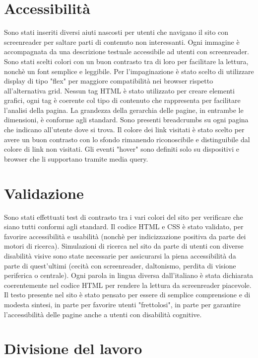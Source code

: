 \documentclass[a4paper, 12pt]{article}
\begin{document}
\section{Accessibilità}
Sono stati inseriti diversi aiuti nascosti per utenti che navigano il sito con screenreader per saltare parti di contenuto non interessanti.
Ogni immagine è accompagnata da una descrizione testuale accessibile ad utenti con screenreader.
Sono stati scelti colori con un buon contrasto tra di loro per facilitare la lettura, nonchè un font semplice e leggibile.
Per l'impaginazione è stato scelto di utilizzare display di tipo "flex" per maggiore compatibilità nei browser rispetto all'alternativa grid.
Nessun tag HTML è stato utilizzato per creare elementi grafici, ogni tag è coerente col tipo di contenuto che rappresenta per facilitare l'analisi della pagina.
La grandezza della gerarchia delle pagine, in entrambe le dimensioni, è conforme agli standard.
Sono presenti breadcrumbs su ogni pagina che indicano all'utente dove si trova.
Il colore dei link visitati è stato scelto per avere un buon contrasto con lo sfondo rimanendo riconoscibile e distinguibile dal colore di link non visitati.
Gli eventi "hover" sono definiti solo su dispositivi e browser che li supportano tramite media query.

\section{Validazione}
Sono stati effettuati test di contrasto tra i vari colori del sito per verificare che siano tutti conformi agli standard.
Il codice HTML e CSS è stato validato, per favorire accessibilità e usabilità (nonchè per indicizzazione positiva da parte dei motori di ricerca).
Simulazioni di ricerca nel sito da parte di utenti con diverse disabilità visive sono state necessarie per assicurarsi la piena accessibilità da parte di quest'ultimi (cecità con screenreader, daltonismo, perdita di visione periferica o centrale).
Ogni parola in lingua diversa dall'italiano è stata dichiarata coerentemente nel codice HTML per rendere la lettura da screenreader piacevole.
Il testo presente nel sito è stato pensato per essere di semplice comprensione e di modesta sintesi, in parte per favorire utenti "frettolosi", in parte per garantire l'accessibilità delle pagine anche
a utenti con disabilità cognitive.
\newpage
\section{Divisione del lavoro}
\end{document}
